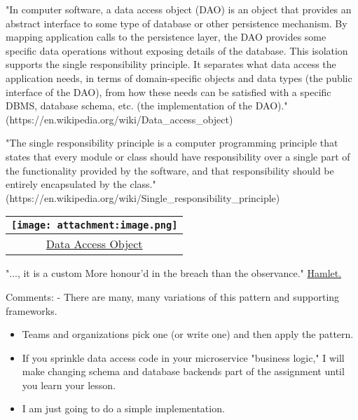 \documentclass[11pt]{article}
\makeatletter
\def\maxwidth{\ifdim\Gin@nat@width>\linewidth\linewidth
    \else\Gin@nat@width\fi}
\let\Oldincludegraphics\includegraphics
\renewcommand{\includegraphics}[1]{\Oldincludegraphics[width=.8\maxwidth]{#1}}
\makeatother
\begin{document}
"In computer software, a data access object (DAO) is an object that
provides an abstract interface to some type of database or other
persistence mechanism. By mapping application calls to the persistence
layer, the DAO provides some specific data operations without exposing
details of the database. This isolation supports the single
responsibility principle. It separates what data access the application
needs, in terms of domain-specific objects and data types (the public
interface of the DAO), from how these needs can be satisfied with a
specific DBMS, database schema, etc. (the implementation of the DAO)."
(https://en.wikipedia.org/wiki/Data\_access\_object)

"The single responsibility principle is a computer programming principle
that states that every module or class should have responsibility over a
single part of the functionality provided by the software, and that
responsibility should be entirely encapsulated by the class."
(https://en.wikipedia.org/wiki/Single\_responsibility\_principle)

\begin{longtable}[]{@{}c@{}}
\toprule
\texttt{[image: attachment:image.png]}\tabularnewline
\midrule
\endhead
\href{http://www.informit.com/articles/article.aspx?p=1398621\&seqNum=3}{Data
Access Object}\tabularnewline
\bottomrule
\end{longtable}

    "..., it is a custom More honour'd in the breach than the observance."
\href{https://en.wikipedia.org/wiki/Hamlet}{Hamlet.}

Comments: - There are many, many variations of this pattern and
supporting frameworks.

\begin{itemize}
\item
  Teams and organizations pick one (or write one) and then apply the
  pattern.
\item
  If you sprinkle data access code in your microservice "business
  logic," I will make changing schema and database backends part of the
  assignment until you learn your lesson.
\item
  I am just going to do a simple implementation.
\end{itemize}
\end{document}
